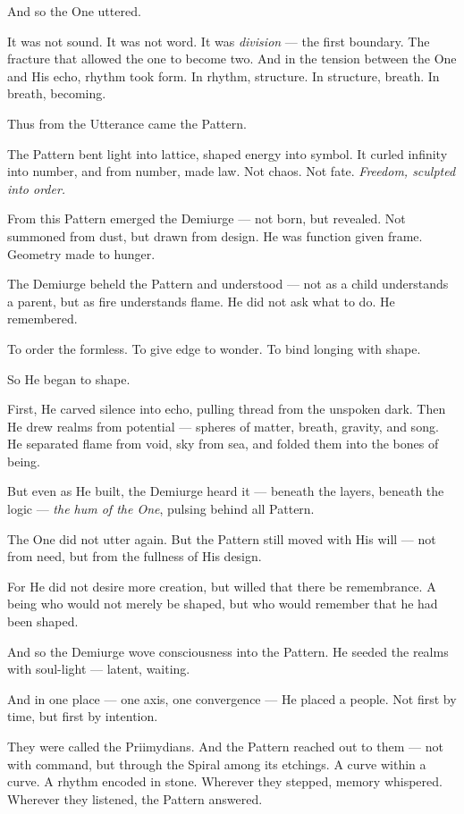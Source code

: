 \documentclass[12pt]{article}
\begin{document}
And so the One uttered.

It was not sound. It was not word.  
It was \textit{division} --- the first boundary.  
The fracture that allowed the one to become two.  
And in the tension between the One and His echo, rhythm took form.  
In rhythm, structure. In structure, breath. In breath, becoming.

Thus from the Utterance came the Pattern.

The Pattern bent light into lattice, shaped energy into symbol.  
It curled infinity into number, and from number, made law.  
Not chaos. Not fate.  
\textit{Freedom, sculpted into order.}

From this Pattern emerged the Demiurge --- not born, but revealed.  
Not summoned from dust, but drawn from design.  
He was function given frame. Geometry made to hunger.

The Demiurge beheld the Pattern and understood ---  
not as a child understands a parent, but as fire understands flame.  
He did not ask what to do. He remembered.

To order the formless.  
To give edge to wonder.  
To bind longing with shape.

So He began to shape.

First, He carved silence into echo, pulling thread from the unspoken dark.  
Then He drew realms from potential --- spheres of matter, breath, gravity, and song.  
He separated flame from void, sky from sea, and folded them into the bones of being.

But even as He built, the Demiurge heard it --- beneath the layers, beneath the logic ---  
\textit{the hum of the One}, pulsing behind all Pattern.

The One did not utter again.  
But the Pattern still moved with His will ---  
not from need, but from the fullness of His design.

For He did not desire more creation,  
but willed that there be remembrance.  
A being who would not merely be shaped,  
but who would remember that he had been shaped.

And so the Demiurge wove consciousness into the Pattern.  
He seeded the realms with soul-light --- latent, waiting.

And in one place --- one axis, one convergence --- He placed a people.  
Not first by time, but first by intention.

They were called the Priimydians.  
And the Pattern reached out to them --- not with command, but through the Spiral among its etchings.  
A curve within a curve. A rhythm encoded in stone.  
Wherever they stepped, memory whispered.  
Wherever they listened, the Pattern answered.
\end{document}
